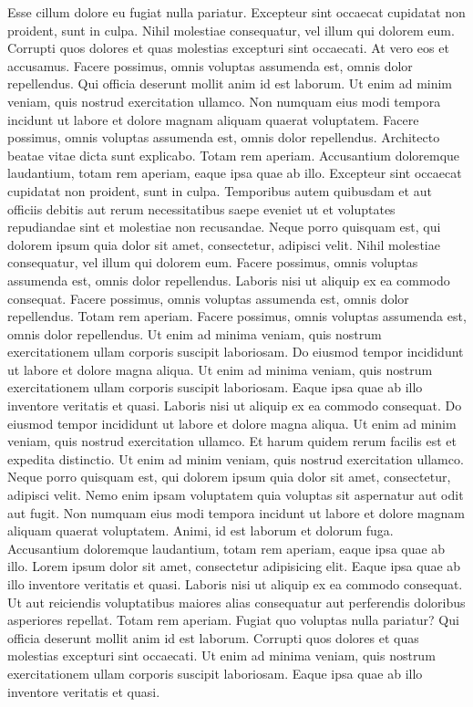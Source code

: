 Esse cillum dolore eu fugiat nulla pariatur. Excepteur sint occaecat
cupidatat non proident, sunt in culpa. Nihil molestiae consequatur, vel
illum qui dolorem eum. Corrupti quos dolores et quas molestias excepturi
sint occaecati. At vero eos et accusamus. Facere possimus, omnis
voluptas assumenda est, omnis dolor repellendus. Qui officia deserunt
mollit anim id est laborum. Ut enim ad minim veniam, quis nostrud
exercitation ullamco. Non numquam eius modi tempora incidunt ut labore
et dolore magnam aliquam quaerat voluptatem. Facere possimus, omnis
voluptas assumenda est, omnis dolor repellendus. Architecto beatae vitae
dicta sunt explicabo. Totam rem aperiam. Accusantium doloremque
laudantium, totam rem aperiam, eaque ipsa quae ab illo. Excepteur sint
occaecat cupidatat non proident, sunt in culpa. Temporibus autem
quibusdam et aut officiis debitis aut rerum necessitatibus saepe eveniet
ut et voluptates repudiandae sint et molestiae non recusandae. Neque
porro quisquam est, qui dolorem ipsum quia dolor sit amet, consectetur,
adipisci velit. Nihil molestiae consequatur, vel illum qui dolorem eum.
Facere possimus, omnis voluptas assumenda est, omnis dolor repellendus.
Laboris nisi ut aliquip ex ea commodo consequat. Facere possimus, omnis
voluptas assumenda est, omnis dolor repellendus. Totam rem aperiam.
Facere possimus, omnis voluptas assumenda est, omnis dolor repellendus.
Ut enim ad minima veniam, quis nostrum exercitationem ullam corporis
suscipit laboriosam. Do eiusmod tempor incididunt ut labore et dolore
magna aliqua. Ut enim ad minima veniam, quis nostrum exercitationem
ullam corporis suscipit laboriosam. Eaque ipsa quae ab illo inventore
veritatis et quasi. Laboris nisi ut aliquip ex ea commodo consequat. Do
eiusmod tempor incididunt ut labore et dolore magna aliqua. Ut enim ad
minim veniam, quis nostrud exercitation ullamco. Et harum quidem rerum
facilis est et expedita distinctio. Ut enim ad minim veniam, quis
nostrud exercitation ullamco. Neque porro quisquam est, qui dolorem
ipsum quia dolor sit amet, consectetur, adipisci velit. Nemo enim ipsam
voluptatem quia voluptas sit aspernatur aut odit aut fugit. Non numquam
eius modi tempora incidunt ut labore et dolore magnam aliquam quaerat
voluptatem. Animi, id est laborum et dolorum fuga. Accusantium
doloremque laudantium, totam rem aperiam, eaque ipsa quae ab illo. Lorem
ipsum dolor sit amet, consectetur adipisicing elit. Eaque ipsa quae ab
illo inventore veritatis et quasi. Laboris nisi ut aliquip ex ea commodo
consequat. Ut aut reiciendis voluptatibus maiores alias consequatur aut
perferendis doloribus asperiores repellat. Totam rem aperiam. Fugiat quo
voluptas nulla pariatur? Qui officia deserunt mollit anim id est
laborum. Corrupti quos dolores et quas molestias excepturi sint
occaecati. Ut enim ad minima veniam, quis nostrum exercitationem ullam
corporis suscipit laboriosam. Eaque ipsa quae ab illo inventore
veritatis et quasi.



